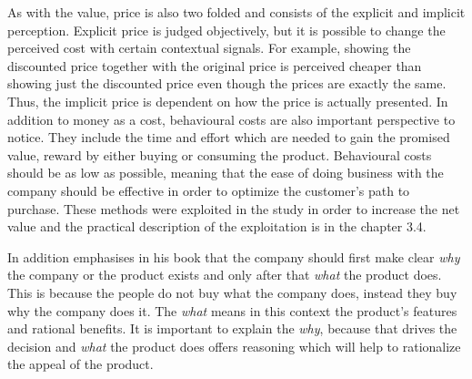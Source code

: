 As with the value, price is also two folded and consists of the explicit and implicit perception. Explicit price is judged objectively, but it is possible to change the perceived cost with certain contextual signals. For example, showing the discounted price together with the original price is perceived cheaper than showing just the discounted price even though the prices are exactly the same. Thus, the implicit price is dependent on how the price is actually presented. In addition to money as a cost, behavioural costs are also important perspective to notice. They include the time and effort which are needed to gain the promised value, reward by either buying or consuming the product. Behavioural costs should be as low as possible, meaning that the ease of doing business with the company should be effective in order to optimize the customer's path to purchase. \parencite{Decoded:2013} These methods were exploited in the study in order to increase the net value and the practical description of the exploitation is in the chapter 3.4.

In addition \textcite{Sinek:2009} emphasises in his book  that the company should first make clear \emph{why} the company or the product exists and only after that \emph{what} the product does. This is because the people do not buy what the company does, instead they buy why the company does it. The \emph{what} means in this context the product's features and rational benefits. It is important to explain the \emph{why}, because that drives the decision and \emph{what} the product does offers reasoning which will help to rationalize the appeal of the product.


